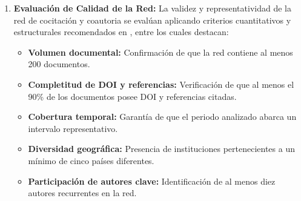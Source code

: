 \documentclass[twoside, twocolumn]{article}
\newcommand{\1}{\mathds{1}}						%
\begin{document}
\begin{enumerate}
\begin{itemize}
        \begin{itemize}
            \item \textbf{Nodos:}
            \begin{itemize}
                \item \texttt{:Paper} (DOI, título, año, citas, palabras clave, etc)
                \item \texttt{:Author} (nombre, ORCID)
                \item \texttt{:Institution} (nombre, país)
                \item \texttt{:Funder} (nombre, país)
                \item \texttt{:Keyword} (término, categoría temática)
            \end{itemize}
            \item \textbf{Relaciones:}
            \begin{itemize}
                \item (\texttt{:Author})\texttt{-[:AUTHORED]->}(\texttt{:Paper})
                \item (\texttt{:Paper})\texttt{-[:Reference]->}(\texttt{:Paper}) \textit{(base para co-citación)}
                \item (\texttt{:Paper})\texttt{-[:AFFILIATED\_WITH]->}(\texttt{:Institution})
                \item (\texttt{:Paper})\texttt{-[:FUNDED\_BY]->}(\texttt{:Funder})
                \item (\texttt{:Paper})\texttt{-[:HAS\_KEYWORD]->}(\texttt{:Keyword})
                \item (\texttt{:Paper})\texttt{-[:CO\_CITED\_WITH]->}(\texttt{:Paper}) \textit{(relación derivada de la co-citación)}
            \end{itemize}
        \end{itemize}
    \end{itemize}

    \item \textbf{Evaluación de Calidad de la Red:} La validez y representatividad de la red de cocitación y coautoria se evalúan aplicando criterios cuantitativos y estructurales recomendados en \cite{Donthu2021}, entre los cuales destacan:
    \begin{itemize}
        \item \textbf{Volumen documental:} Confirmación de que la red contiene al menos 200 documentos.
        \item \textbf{Completitud de DOI y referencias:} Verificación de que al menos el 90\% de los documentos posee DOI y referencias citadas.
        \item \textbf{Cobertura temporal:} Garantía de que el periodo analizado abarca un intervalo representativo.
        \item \textbf{Diversidad geográfica:} Presencia de instituciones pertenecientes a un mínimo de cinco países diferentes.
        \item \textbf{Participación de autores clave:} Identificación de al menos diez autores recurrentes en la red.
    \end{itemize}


\end{enumerate}
\end{document}

